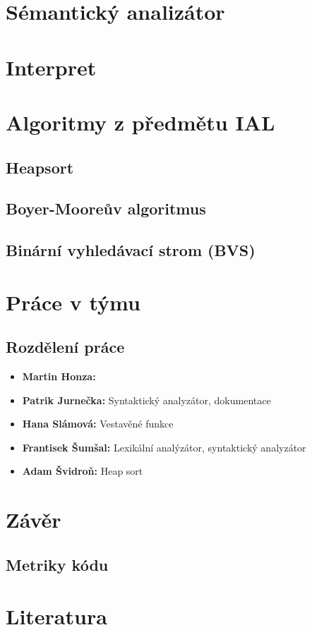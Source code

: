 \documentclass[a4paper, 11pt, titlepage]{article}
\begin{document}
\section{Sémantický analizátor}

\section{Interpret}

\newpage

\section{Algoritmy z předmětu IAL}

\subsection{Heapsort}
\subsection{Boyer-Mooreův algoritmus}
\subsection{Binární vyhledávací strom (BVS)}

\newpage

\section{Práce v týmu}
\subsection{Rozdělení práce}

\begin{itemize}
	\item\textbf{Martin Honza:}
	\item\textbf{Patrik Jurnečka:} Syntaktický analyzátor, dokumentace
	\item\textbf{Hana Slámová:} Vestavěné funkce
	\item\textbf{Frantisek Šumšal:} Lexikální analýzátor, syntaktický analyzátor
	\item\textbf{Adam Švidroň:} Heap sort
\end{itemize}  

\section{Závěr}
\subsection{Metriky kódu}

\section{Literatura}


\end{document}

